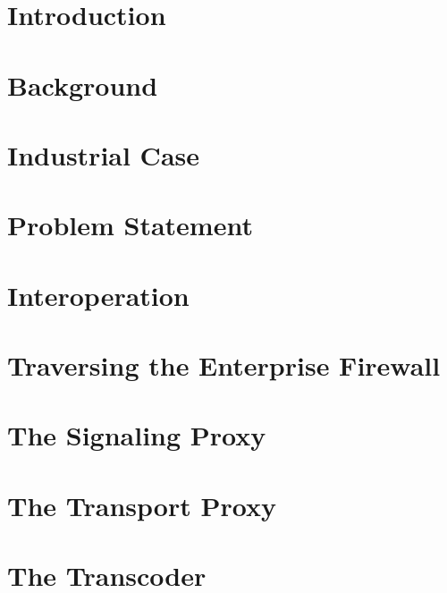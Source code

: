 \chapter{Introduction}


\chapter{Background}


\chapter{Industrial Case}


\chapter{Problem Statement}


\chapter{Interoperation}


\chapter{Traversing the Enterprise Firewall}


\chapter{The Signaling Proxy}


\chapter{The Transport Proxy}


\chapter{The Transcoder}


% 

